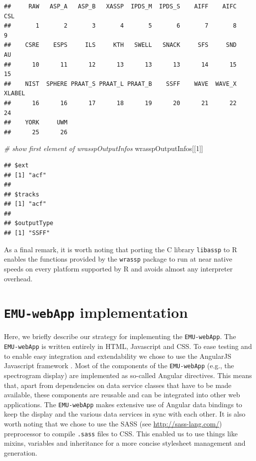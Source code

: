 \documentclass[]{book}
\newenvironment{Shaded}{\begin{snugshade}}{\end{snugshade}}
\newcommand{\CommentTok}[1]{\textcolor[rgb]{0.56,0.35,0.01}{\textit{#1}}}
\newcommand{\DecValTok}[1]{\textcolor[rgb]{0.00,0.00,0.81}{#1}}
\newcommand{\NormalTok}[1]{#1}
\theoremstyle{definition}
\theoremstyle{definition}
\theoremstyle{definition}
\theoremstyle{remark}
\begin{document}
\begin{verbatim}
##     RAW   ASP_A   ASP_B   XASSP  IPDS_M  IPDS_S    AIFF    AIFC     CSL 
##       1       2       3       4       5       6       7       8       9 
##    CSRE    ESPS     ILS     KTH   SWELL   SNACK     SFS     SND      AU 
##      10      11      12      13      13      13      14      15      15 
##    NIST  SPHERE PRAAT_S PRAAT_L PRAAT_B    SSFF    WAVE  WAVE_X  XLABEL 
##      16      16      17      18      19      20      21      22      24 
##    YORK     UWM 
##      25      26
\end{verbatim}

\begin{Shaded}
\begin{Highlighting}[]
\CommentTok{# show first element of wrasspOutputInfos}
\NormalTok{wrasspOutputInfos[[}\DecValTok{1}\NormalTok{]]}
\end{Highlighting}
\end{Shaded}

\begin{verbatim}
## $ext
## [1] "acf"
## 
## $tracks
## [1] "acf"
## 
## $outputType
## [1] "SSFF"
\end{verbatim}

As a final remark, it is worth noting that porting the C library
\texttt{libassp} to R enables the functions provided by the
\texttt{wrassp} package to run at near native speeds on every platform
supported by R and avoids almost any interpreter overhead.

\hypertarget{chap:emu-webAppImplementation}{%
\chapter{\texorpdfstring{\texttt{EMU-webApp}
implementation}{EMU-webApp implementation}}\label{chap:emu-webAppImplementation}}

Here, we briefly describe our strategy for implementing the
\texttt{EMU-webApp}. The \texttt{EMU-webApp} is written entirely in
HTML, Javascript and CSS. To ease testing and to enable easy integration
and extendability we chose to use the AngularJS Javascript framework
\citep{google:2014a}. Most of the components of the \texttt{EMU-webApp}
(e.g., the spectrogram display) are implemented as so-called Angular
directives. This means that, apart from dependencies on data service
classes that have to be made available, these components are reusable
and can be integrated into other web applications. The
\texttt{EMU-webApp} makes extensive use of Angular data bindings to keep
the display and the various data services in sync with each other. It is
also worth noting that we chose to use the SASS (see
\url{http://sass-lang.com/}) preprocessor to compile \texttt{.sass}
files to CSS. This enabled us to use things like mixins, variables and
inheritance for a more concise stylesheet management and generation.
\end{document}
